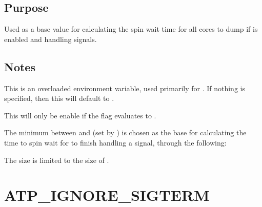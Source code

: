 \documentclass[letterpaper,10pt,english]{sphinxmanual}
\begin{document}
\subsection{Purpose}
\label{\detokenize{flag/flag:id51}}
\sphinxAtStartPar
Used as a base value for calculating the spin wait time for all cores to dump if  is enabled and handling signals.


\subsection{Notes}
\label{\detokenize{flag/flag:id52}}
\sphinxAtStartPar
This is an overloaded environment variable, used primarily for . If nothing is specified, then this will default to .

\sphinxAtStartPar
This will only be enable if the {\hyperref[\detokenize{flag/flag:atp-enabled}]{}} flag evaluates to .

\sphinxAtStartPar
The minimum between  and  (set by {\hyperref[\detokenize{flag/flag:dr-hook-harakiri-timeout}]{}}) is chosen as the base for calculating the time to spin wait for  to finish handling a signal, through the following:

\begin{sphinxVerbatim}[commandchars=\\\{\}]
\end{sphinxVerbatim}

\sphinxAtStartPar
The size is limited to the size of .


\section{ATP\_IGNORE\_SIGTERM}
\label{\detokenize{flag/flag:atp-ignore-sigterm}}\label{\detokenize{flag/flag:id54}}
\end{document}
